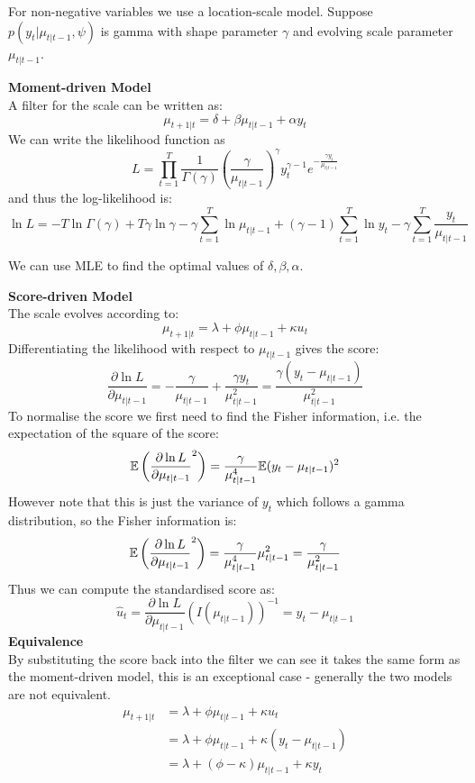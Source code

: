 \documentclass[DIV=14,titlepage=false]{scrreprt}
\begin{document}
\begin{example}
    For non-negative variables we use a location-scale model. Suppose $p(y_t|\mu_{t|t-1}, \psi)$ is gamma with shape parameter $\gamma$ and evolving scale parameter $\mu_{t|t-1}$. 
    
    \textbf{Moment-driven Model}\\
    A filter for the scale can be written as:
    \[
        \mu_{t+1|t} = \delta + \beta \mu_{t|t-1} + \alpha y_t
    \]
    We can write the likelihood function as 
    \[
        L = \prod_{t=1}^T \frac{1}{\Gamma(\gamma)}\left(\frac{\gamma}{\mu_{t|t-1}}\right) ^ \gamma y_t^{\gamma-1} e^{-\frac{\gamma y_t}{\mu_{t|t-1}}}
    \]
    and thus the log-likelihood is:
    \[
        \ln L = -T \ln \Gamma(\gamma) + T \gamma \ln \gamma -\gamma \sum_{t=1}^T \ln \mu_{t|t-1} + (\gamma - 1) \sum_{t=1}^T \ln y_t - \gamma \sum_{t=1}^T \frac{y_t}{\mu_{t|t-1}}
    \]

    We can use MLE to find the optimal values of $\delta, \beta, \alpha$.

    \textbf{Score-driven Model}\\
    The scale evolves according to:
    \[
        \mu_{t+1|t} = \lambda + \phi \mu_{t|t-1} + \kappa u_t
        \]
    Differentiating the likelihood with respect to $\mu_{t|t-1}$ gives the score:
    \[
        \frac{\partial \ln L}{\partial \mu_{t|t-1}} = -\frac{\gamma}{\mu_{t|t-1}} + \frac{\gamma y_t}{\mu_{t|t-1}^2} = \frac{\gamma(y_t - \mu_{t|t-1})}{\mu_{t|t-1}^2}
    \]
    To normalise the score we first need to find the Fisher information, i.e. the expectation of the square of the score:
    \[
        \mathbb{E}\left(\frac{\partial \ln L}{\partial \mu_{t|t-1}}^2\right) = \frac{\gamma}{\mu_{t|t-1}^4} \mathbb{E}(y_t - \mu_{t|t-1})^2
    \]
    However note that this is just the variance of $y_t$ which follows a gamma distribution, so the Fisher information is:
    \[
        \mathbb{E}\left(\frac{\partial \ln L}{\partial \mu_{t|t-1}}^2\right) = \frac{\gamma}{\mu_{t|t-1}^4}\mu_{t|t-1}^2 = \frac{\gamma}{\mu_{t|t-1}^2}
    \]
    Thus we can compute the standardised score as:
    \[
        \hat u_t = \frac{\partial \ln L}{\partial \mu_{t|t-1}} \left(I(\mu_{t|t-1})\right)^{-1} = y_t - \mu_{t|t-1}
    \]
    \textbf{Equivalence}\\
    By substituting the score back into the filter we can see it takes the same form as the moment-driven model, this is an exceptional case - generally the two models are not equivalent.
    \begin{align*}
        \mu_{t+1|t} &= \lambda +\phi \mu_{t|t-1} + \kappa u_t\\
        &= \lambda +\phi \mu_{t|t-1} + \kappa (y_t - \mu_{t|t-1})\\
        &= \lambda + (\phi - \kappa) \mu_{t|t-1} + \kappa y_t
    \end{align*}
\end{example}
\end{document}
